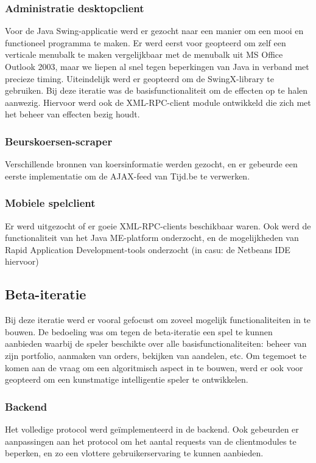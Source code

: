 \subsubsection{Administratie desktopclient}
Voor de Java Swing-applicatie werd er gezocht naar een manier om een mooi en functioneel programma te maken. Er werd eerst voor geopteerd om zelf een verticale menubalk te maken vergelijkbaar met de menubalk uit MS Office Outlook 2003, maar we liepen al snel tegen beperkingen van Java in verband met precieze timing. Uiteindelijk werd er geopteerd om de SwingX-library te gebruiken.
Bij deze iteratie was de basisfunctionaliteit om de effecten op te halen aanwezig. Hiervoor werd ook de XML-RPC-client module ontwikkeld die zich met het beheer van effecten bezig houdt.

\subsubsection{Beurskoersen-scraper}
Verschillende bronnen van koersinformatie werden gezocht, en er gebeurde een eerste implementatie om de AJAX-feed van Tijd.be te verwerken.

\subsubsection{Mobiele spelclient}
Er werd uitgezocht of er goeie XML-RPC-clients beschikbaar waren. Ook werd de functionaliteit van het Java ME-platform onderzocht, en de mogelijkheden van Rapid Application Development-tools onderzocht (in casu: de Netbeans IDE hiervoor)


\subsection{Beta-iteratie}
Bij deze iteratie werd er vooral gefocust om zoveel mogelijk functionaliteiten in te bouwen. De bedoeling was om tegen de beta-iteratie een spel te kunnen aanbieden waarbij de speler beschikte over alle basisfunctionaliteiten: beheer van zijn portfolio, aanmaken van orders, bekijken van aandelen, etc.
Om tegemoet te komen aan de vraag om een algoritmisch aspect in te bouwen, werd er ook voor geopteerd om een kunstmatige intelligentie speler te ontwikkelen.

\subsubsection{Backend}
Het volledige protocol werd ge\"implementeerd in de backend. Ook gebeurden er aanpassingen aan het protocol om het aantal requests van de clientmodules te beperken, en zo een vlottere gebruikerservaring te kunnen aanbieden.

